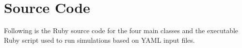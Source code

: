 \appendix
\chapter{Source Code} %
\label{cha:source_code}
Following is the Ruby source code for the four main classes and the executable Ruby script used to run simulations based on YAML input files.
\lstset{language=Ruby, numbers=left, basicstyle=\scriptsize \tt, showstringspaces=false, commentstyle=\tt}
\lstset{title=environment.rb}

\lstset{title=organism.rb}

\lstset{title=genome.rb}

\lstset{title=polymerase.rb}

\lstset{title=evolver}

